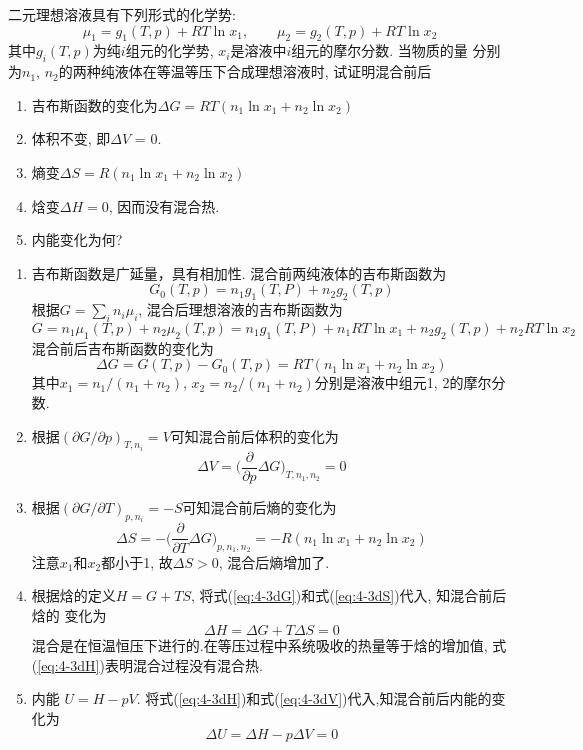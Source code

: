 \begin{problem}[4.3]
二元理想溶液具有下列形式的化学势:
\[
\mu_1 = g_1(T,p) + RT\ln x_1,\qquad
\mu_2 = g_2(T,p) + RT\ln x_2
\]
其中$g_i(T,p)$为纯$i$组元的化学势, $x_i$是溶液中$i$组元的摩尔分数. 当物质的量
分别为$n_1$, $n_2$的两种纯液体在等温等压下合成理想溶液时, 试证明混合前后
\begin{enumerate}
\item 吉布斯函数的变化为$\Delta G = RT(n_1\ln x_1 + n_2\ln x_2)$
\item 体积不变, 即$\Delta V$ = 0.
\item 熵变$\Delta S = R(n_1\ln x_1 + n_2\ln x_2)$
\item 焓变$\Delta H = 0$, 因而没有混合热.
\item 内能变化为何?
\end{enumerate}
\end{problem}
\begin{solution}

\begin{enumerate}
\item 吉布斯函数是广延量，具有相加性. 混合前两纯液体的吉布斯函数为
\[
G_0(T,p) = n_1g_1(T,P) + n_2g_2(T,p)
\]
根据$G=\sum_in_i\mu_i$, 混合后理想溶液的吉布斯函数为
\[
G = n_1\mu_1(T,p) + n_2\mu_2(T,p) = n_1g_1(T,P) +n_1RT\ln x_1+ n_2g_2(T,p) +n_2RT\ln x_2
\]
混合前后吉布斯函数的变化为
\begin{equation}\label{eq:4-3dG}
\Delta G = G(T,p) - G_0(T,p) = RT(n_1\ln x_1 +n_2\ln x_2)
\end{equation}
其中$x_1=n_1/(n_1+n_2)$, $x_2=n_2/(n_1+n_2)$分别是溶液中组元1, 2的摩尔分数.
\item 根据$(\partial G/\partial p)_{T,n_i}=V$可知混合前后体积的变化为
\begin{equation}\label{eq:4-3dV}
\Delta V = \bigg(\frac{\partial}{\partial p}\Delta G\bigg)_{T,n_1,n_2} = 0
\end{equation}
\item 根据$(\partial G/\partial T)_{p,n_i}=-S$可知混合前后熵的变化为
\begin{equation}\label{eq:4-3dS}
\Delta S = -\bigg(\frac{\partial}{\partial T}\Delta G\bigg)_{p,n_1,n_2} = -R(n_1\ln x_1 + n_2\ln x_2)
\end{equation}
注意$x_1$和$x_2$都小于1, 故$\Delta S>0$, 混合后熵增加了.
\item 根据焓的定义$H=G+TS$,  将式(\ref{eq:4-3dG})和式(\ref{eq:4-3dS})代入, 知混合前后焓的
变化为
\begin{equation}\label{eq:4-3dH}
\Delta H =\Delta G + T\Delta S = 0
\end{equation}
混合是在恒温恒压下进行的.在等压过程中系统吸收的热量等于焓的增加值, 式(\ref{eq:4-3dH})表明混合过程没有混合热.
\item 内能 $U=H-pV$. 将式(\ref{eq:4-3dH})和式(\ref{eq:4-3dV})代入,知混合前后内能的变化为
\[
\Delta U = \Delta H - p\Delta V = 0
\]
\end{enumerate}

\end{solution}
